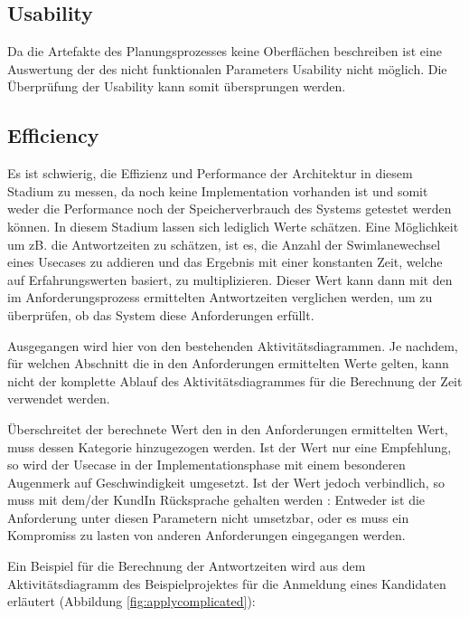 \subsection{Usability}
Da die Artefakte des Planungsprozesses keine Oberflächen beschreiben ist eine Auswertung der des nicht funktionalen Parameters Usability nicht möglich. Die Überprüfung der Usability kann somit übersprungen werden.

\subsection{Efficiency}
Es ist schwierig, die Effizienz und Performance der Architektur in diesem Stadium zu messen, da noch keine Implementation vorhanden ist und somit weder die Performance noch der Speicherverbrauch des Systems getestet werden können. In diesem Stadium lassen sich lediglich Werte schätzen. Eine Möglichkeit um zB. die Antwortzeiten zu schätzen, ist es, die Anzahl der Swimlanewechsel eines Usecases zu addieren und das Ergebnis mit einer konstanten Zeit, welche auf Erfahrungswerten basiert, zu multiplizieren. Dieser Wert kann dann mit den im Anforderungsprozess ermittelten Antwortzeiten verglichen werden, um zu überprüfen, ob das System diese Anforderungen erfüllt.

Ausgegangen wird hier von den bestehenden Aktivitätsdiagrammen. Je nachdem, für welchen Abschnitt die in den Anforderungen ermittelten Werte gelten, kann nicht der komplette Ablauf des Aktivitätsdiagrammes für die Berechnung der Zeit verwendet werden.

Überschreitet der berechnete Wert den in den Anforderungen ermittelten Wert, muss dessen Kategorie hinzugezogen werden. Ist der Wert nur eine Empfehlung, so wird der Usecase in der Implementationsphase mit einem besonderen Augenmerk auf Geschwindigkeit umgesetzt. Ist der Wert jedoch verbindlich, so muss mit dem/der KundIn Rücksprache gehalten werden \cite[S. 70]{effektiv}: Entweder ist die Anforderung unter diesen Parametern nicht umsetzbar, oder es muss ein Kompromiss zu lasten von anderen Anforderungen eingegangen werden.

Ein Beispiel für die Berechnung der Antwortzeiten wird aus dem Aktivitätsdiagramm des Beispielprojektes für die Anmeldung eines Kandidaten erläutert (Abbildung \ref{fig:applycomplicated}):

